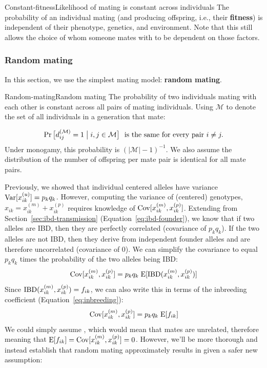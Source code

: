 \documentclass[12pt]{article}
\numberwithin{equation}{section}
\begin{document}

\begin{assumption}{Constant-fitness}{Likelihood of mating is constant across individuals}
The probability of an individual mating (and producing offspring, i.e., their \textbf{fitness}) is independent of their phenotype, genetics, and environment.
Note that this still allows the choice of whom someone mates with to be dependent on those factors.
\end{assumption}

\subsubsection{Random mating}\label{sec:rm-random-mating}

In this section, we use the simplest mating model: \textbf{random mating}.

\begin{assumption}{Random-mating}{Random mating}
The probability of two individuals mating with each other is constant across all pairs of mating individuals.
Using $\mathcal{M}$ to denote the set of all individuals in a generation that mate:

$$ \Pr\big[d^{(\mathcal{M})}_{ij} = 1 \;\big|\; i, j \in \mathcal{M}\big] \ \text{ is the same for every pair } i \neq j . $$
Under monogamy, this probability is $(|\mathcal{M}| - 1)^{-1}$.
We also assume the distribution of the number of offspring per mate pair is identical for all mate pairs.
\end{assumption}

Previously, we showed that individual centered alleles have variance $\mathrm{Var}[x^{(u)}_{ik}] = p_k q_k$.
However, computing the variance of (centered) genotypes, $x_{ik} = x^{(m)}_{ik} + x^{(p)}_{ik}$ requires knowledge of $\mathrm{Cov}[x^{(m)}_{ik},x^{(p)}_{ik}]$.
Extending from Section~\ref{sec:ibd-transmission} (Equation~\eqref{eq:ibd-founder}), we know that if two alleles are IBD, then they are perfectly correlated (covariance of $p_k q_k$).
If the two alleles are not IBD, then they derive from independent founder alleles and are therefore uncorrelated (covariance of $0$).
We can simplify the covariance to equal $p_k q_k$ times the probability of the two alleles being IBD:
$$
\mathrm{Cov}[x^{(m)}_{ik},x^{(p)}_{ik}] = p_k q_k \;
\mathrm{E}[ \mathrm{IBD}(x^{(m)}_{ik},x^{(p)}_{ik}) ]
$$
Since $\mathrm{IBD}(x^{(m)}_{ik},x^{(p)}_{ik}) = f_{ik}$, we can also write this in terms of the inbreeding coefficient (Equation~\eqref{eq:inbreeding}):
$$
\mathrm{Cov}[x^{(m)}_{ik},x^{(p)}_{ik}] = p_k q_k \; \mathrm{E}[ f_{ik}]
$$
We could simply assume , which would mean that mates are unrelated, therefore meaning that $\mathrm{E}[ f_{ik}] = \mathrm{Cov}[x^{(m)}_{ik},x^{(p)}_{ik}] = 0$.
However, we'll be more thorough and instead establish that random mating approximately results in  given a safer new assumption:
\end{document}
